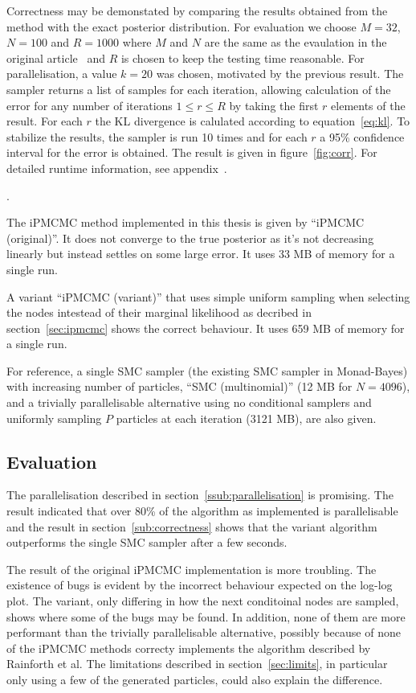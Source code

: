 Correctness may be demonstated by comparing the results obtained from the method with the exact posterior distribution. For evaluation we choose $M=32$, $N=100$ and $R=1000$ where $M$ and $N$ are the same as the evaulation in the original article~\cite{ipmcmc} and $R$ is chosen to keep the testing time reasonable.  For parallelisation, a value $k=20$ was chosen, motivated by the previous result. The sampler returns a list of samples for each iteration, allowing calculation of the error for any number of iterations $1 \leq r \leq R$ by taking the first $r$ elements of the result. For each $r$ the KL divergence is calulated according to equation~\ref{eq:kl}. To stabilize the results, the sampler is run 10 times and for each $r$ a 95\% confidence interval for the error is obtained. The result is given in figure~\ref{fig:corr}. For detailed runtime information, see appendix~\cite{sec:runtime}.

.

The iPMCMC method implemented in this thesis is given by ``iPMCMC (original)''. It does not converge to the true posterior as it's not decreasing linearly but instead settles on some large error. It uses 33 MB of memory for a single run.

A variant ``iPMCMC (variant)'' that uses simple uniform sampling when selecting the nodes intestead of their marginal likelihood as decribed in section~\ref{sec:ipmcmc} shows the correct behaviour. It uses 659 MB of memory for a single run.

For reference, a single SMC sampler (the existing SMC sampler in Monad-Bayes) with increasing number of particles, ``SMC (multinomial)'' (12 MB for $N=4096$), and a trivially parallelisable alternative using no conditional samplers and uniformly sampling $P$ particles at each iteration (3121 MB), are also given.

\subsection{Evaluation}

The parallelisation described in section~\ref{ssub:parallelisation} is promising. The result indicated that over 80\% of the algorithm as implemented is parallelisable and the result in section~\ref{sub:correctness} shows that the variant algorithm outperforms the single SMC sampler after a few seconds.

The result of the original iPMCMC implementation is more troubling. The existence of bugs is evident by the incorrect behaviour expected on the log-log plot. The variant, only differing in how the next conditoinal nodes are sampled, shows where some of the bugs may be found. In addition, none of them are more performant than the trivially parallelisable alternative, possibly because of none of the iPMCMC methods correcty implements the algorithm described by Rainforth et al. The limitations described in section~\ref{sec:limits}, in particular only using a few of the generated particles, could also explain the difference.
